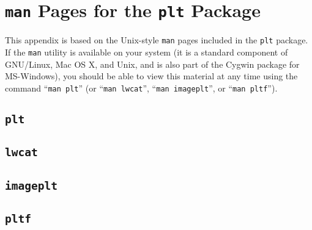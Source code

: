 \documentclass{book}
\begin{document}
\chapter{{\tt man} Pages for the {\tt plt} Package\label{sec:man-page}}

This appendix is based on the Unix-style {\tt man} pages included in
the {\tt plt} package.  If the {\tt man} utility is available on your
system (it is a standard component of GNU/Linux, Mac OS X, and Unix,
and is also part of the Cygwin package for MS-Windows), you should be
able to view this material at any time using the command ``{\tt man
plt}'' (or ``{\tt man lwcat}'', ``{\tt man imageplt}'', or ``{\tt man pltf}'').

\section*{{\tt plt}}

\newpage
\section*{{\tt lwcat}}

\newpage
\section*{{\tt imageplt}}

\newpage
\section*{{\tt pltf}}


\printindex
\end{document}
